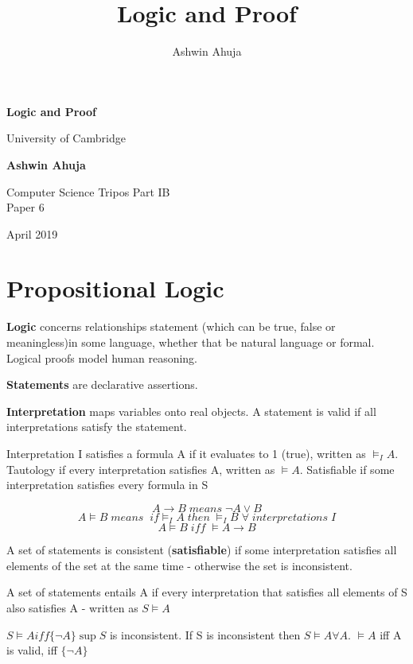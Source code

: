\documentclass{article}
\title{Logic and Proof}
\author{Ashwin Ahuja}
\newenvironment{definition}{\par\color{blue}}{\par}
\begin{document}
\makeatletter
\renewcommand{\l@subsection}{\@dottedtocline{2}{1.6em}{2.6em}}
\makeatother

\begin{titlepage}
\begin{center}
			\vspace*{1cm}
			
			\Huge
			\textbf{Logic and Proof}
			
			\vspace{0.5cm}
			\LARGE
			University of Cambridge
			
			\vspace{1.5cm}
			
			\textbf{Ashwin Ahuja}
			
			\vfill
			
			Computer Science Tripos Part IB\\
			Paper 6
			
			\vspace{5cm}
			
			April 2019
			
\end{center}
\end{titlepage}

\tableofcontents
\pagebreak

\section{Propositional Logic}
\begin{definition}
\textbf{Logic} concerns relationships statement (which can be true, false or meaningless)in some language, whether that be natural language or formal. Logical proofs model human reasoning.

\bigskip
\noindent
\textbf{Statements} are declarative assertions.

\bigskip
\noindent
\textbf{Interpretation} maps variables onto real objects. A statement is valid if all interpretations satisfy the statement.

Interpretation I satisfies a formula A if it evaluates to 1 (true), written as $\vDash _{I}A$. Tautology if every interpretation satisfies A, written as $\vDash A$. Satisfiable if some interpretation satisfies every formula in S

$$A \rightarrow B \; means \; \neg A \vee B$$
$$A \vDash B \; means \; \; if \vDash _{I} A \; then \; \vDash _{I} B \; \forall \; interpretations \; I $$
$$A \vDash B \; iff \; \vDash A \rightarrow B$$

\bigskip
\noindent
A set of statements is consistent (\textbf{satisfiable}) if some interpretation satisfies all elements of the set at the same time - otherwise the set is inconsistent. 

A set of statements entails A if every interpretation that satisfies all elements of S also satisfies A - written as $S \vDash A$

$S \vDash A iff \{ \neg A \} \sup S$ is inconsistent. If S is inconsistent then $S \vDash A \forall A$. $\vDash A$ iff A is valid, iff $\{ \neg A \}$
\end{definition}
\end{document}
